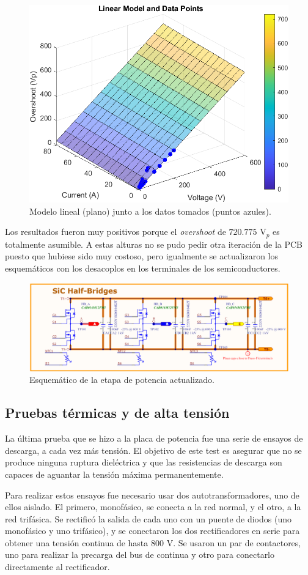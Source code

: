 \begin{figure}[H]
	\centering
	\includegraphics[width=0.7\linewidth]{fig/overshootFinal3}
	\caption{Modelo lineal (plano) junto a los datos tomados (puntos azules).}
\end{figure}

Los resultados fueron muy positivos porque el \textit{overshoot} de $720.775 \text{ V}_p$ es totalmente asumible. A estas alturas no se pudo pedir otra iteración de la PCB puesto que hubiese sido muy costoso, pero igualmente se actualizaron los esquemáticos con los desacoplos en los terminales de los semiconductores.

\begin{figure}[H]
	\centering
	\includegraphics[width=0.7\linewidth]{fig/schPowerDecoupling}
	\caption{Esquemático de la etapa de potencia actualizado.}
\end{figure}


\subsection{Pruebas térmicas y de alta tensión}

La última prueba que se hizo a la placa de potencia fue una serie de ensayos de descarga, a cada vez más tensión. El objetivo de este test es asegurar que no se produce ninguna ruptura dieléctrica y que las resistencias de descarga son capaces de aguantar la tensión máxima permanentemente.

Para realizar estos ensayos fue necesario usar dos autotransformadores, uno de ellos aislado. El primero, monofásico, se conecta a la red normal, y el otro, a la red trifásica. Se rectificó la salida de cada uno con un puente de diodos (uno monofásico y uno trifásico), y se conectaron los dos rectificadores en serie para obtener una tensión continua de hasta 800 V. Se usaron un par de contactores, uno para realizar la precarga del bus de continua y otro para conectarlo directamente al rectificador.

